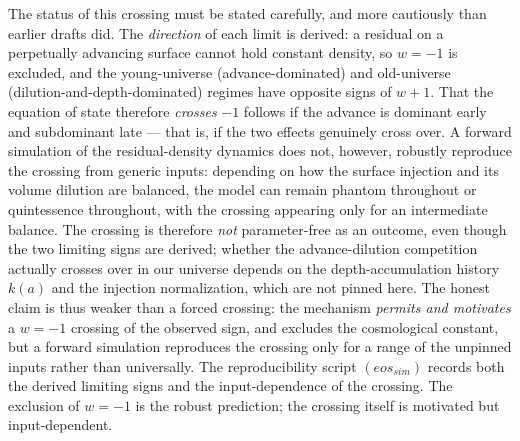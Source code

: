 \documentclass[11pt,oneside]{report}
\theoremstyle{definition}
\theoremstyle{remark}
\begin{document}
The status of this crossing must be stated carefully, and more cautiously than
earlier drafts did. The \emph{direction} of each limit is derived: a residual on a
perpetually advancing surface cannot hold constant density, so \ensuremath{w = -1} is
excluded, and the young-universe (advance-dominated) and old-universe
(dilution-and-depth-dominated) regimes have opposite signs of \ensuremath{w+1}. That the
equation of state therefore \emph{crosses} \ensuremath{-1} follows if the advance is dominant
early and subdominant late --- that is, if the two effects genuinely cross over. A
forward simulation of the residual-density dynamics does not, however, robustly
reproduce the crossing from generic inputs: depending on how the surface injection
and its volume dilution are balanced, the model can remain phantom throughout or
quintessence throughout, with the crossing appearing only for an intermediate
balance. The crossing is therefore \emph{not} parameter-free as an outcome, even
though the two limiting signs are derived; whether the advance-dilution
competition actually crosses over in our universe depends on the depth-accumulation
history \ensuremath{k(a)} and the injection normalization, which are not pinned here. The
honest claim is thus weaker than a forced crossing: the mechanism \emph{permits and
motivates} a \ensuremath{w=-1} crossing of the observed sign, and excludes the cosmological
constant, but a forward simulation reproduces the crossing only for a range of the
unpinned inputs rather than universally. The reproducibility script
\ensuremath{(eos_{sim})} records both the derived limiting signs and the input-dependence of
the crossing. The exclusion of \ensuremath{w=-1} is the robust prediction; the crossing
itself is motivated but input-dependent.
\end{document}
